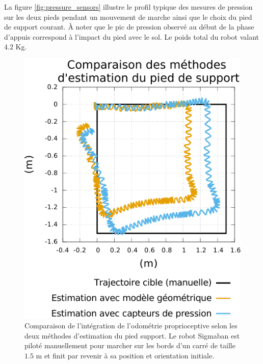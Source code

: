 La figure \ref{fig:pressure_sensors} illustre le profil typique des mesures
de pression sur les deux pieds pendant un mouvement de marche ainsi
que le choix du pied de support courant.
À noter que le pic de pression observé au début de la phase d'appuis 
correspond à l'impact du pied avec le sol. Le poids total du robot 
valant $4.2$ Kg.\\

\begin{figure}[htb]
    \begin{center}
        \includegraphics[type=pdf,ext=.pdf,read=.pdf,width=1.0\linewidth]{../plot/odometry_pressure_comparison}
        \caption{\label{fig:odometry_pressure_comparison} Comparaison de l'intégration
            de l'odométrie proprioceptive selon les deux méthodes d'estimation du pied support.
            Le robot Sigmaban est piloté manuellement pour marcher sur les bords 
            d'un carré de taille $1.5$ m et finit par revenir à sa position et
            orientation initiale.
        }
    \end{center}
\end{figure}

